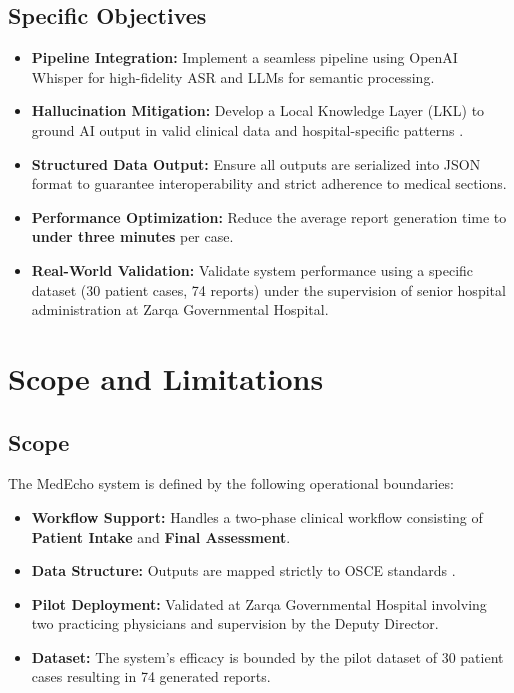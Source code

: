 \subsection*{Specific Objectives}
\begin{itemize}
    \item \textbf{Pipeline Integration:} Implement a seamless pipeline using OpenAI Whisper \cite{radford2023robust} for high-fidelity ASR and LLMs for semantic processing.
    \item \textbf{Hallucination Mitigation:} Develop a Local Knowledge Layer (LKL) to ground AI output in valid clinical data and hospital-specific patterns \cite{lewis2020retrieval}.
    \item \textbf{Structured Data Output:} Ensure all outputs are serialized into JSON format \cite{json2017standard} to guarantee interoperability and strict adherence to medical sections.
    \item \textbf{Performance Optimization:} Reduce the average report generation time to \textbf{under three minutes} per case.
    \item \textbf{Real-World Validation:} Validate system performance using a specific dataset (30 patient cases, 74 reports) under the supervision of senior hospital administration at Zarqa Governmental Hospital.
\end{itemize}

\section{Scope and Limitations}\label{sec:intro:scope}

\subsection*{Scope}
The MedEcho system is defined by the following operational boundaries:
\begin{itemize}
    \item \textbf{Workflow Support:} Handles a two-phase clinical workflow consisting of \textbf{Patient Intake} and \textbf{Final Assessment}.
    \item \textbf{Data Structure:} Outputs are mapped strictly to OSCE standards \cite{harden1975assessment}.
    \item \textbf{Pilot Deployment:} Validated at Zarqa Governmental Hospital involving two practicing physicians and supervision by the Deputy Director.
    \item \textbf{Dataset:} The system's efficacy is bounded by the pilot dataset of 30 patient cases resulting in 74 generated reports.
\end{itemize}


